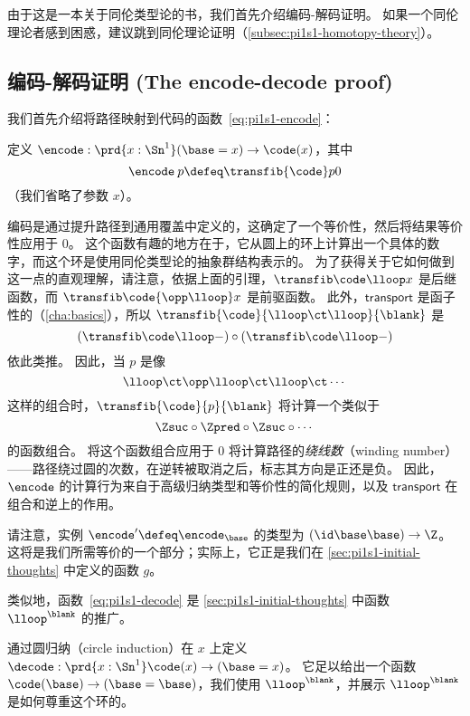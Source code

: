 由于这是一本关于同伦类型论的书，我们首先介绍编码-解码证明。
如果一个同伦理论者感到困惑，建议跳到同伦理论证明（\cref{subsec:pi1s1-homotopy-theory}）。

%
%
%

\subsection{编码-解码证明 (The encode-decode proof)}
\label{subsec:pi1s1-encode-decode}

%
%
%
我们首先介绍将路径映射到代码的函数~\eqref{eq:pi1s1-encode}：
\begin{defn}
  定义 $\encode : \prd{x : \Sn ^1} (\base=x) \rightarrow  \code(x)$，其中
  \[
    \encode \: p \defeq \transfib{\code} p 0
  \]
  （我们省略了参数 $x$）。
\end{defn}
编码是通过提升路径到通用覆盖中定义的，这确定了一个等价性，然后将结果等价性应用于 $0$。
这个函数有趣的地方在于，它从圆上的环上计算出一个具体的数字，而这个环是使用同伦类型论的抽象群结构表示的。
为了获得关于它如何做到这一点的直观理解，请注意，依据上面的引理，$\transfib \code \lloop x$ 是后继函数，而 $\transfib \code {\opp\lloop} x$ 是前驱函数。
此外，$\mathsf{transport}$ 是函子性的（\cref{cha:basics}），所以 $\transfib{\code} {\lloop \ct \lloop}{\blank}$ 是
\[(\transfib \code \lloop-) \circ (\transfib \code \lloop-)\]
依此类推。
因此，当 $p$ 是像
\[
  \lloop \ct \opp \lloop \ct \lloop \ct \cdots
\]
这样的组合时，$\transfib{\code}{p}{\blank}$ 将计算一个类似于
\[
  \Zsuc \circ \Zpred \circ \Zsuc \circ \cdots
\]
的函数组合。
将这个函数组合应用于 $0$ 将计算路径的\emph{绕线数}（winding number）——路径绕过圆的次数，在逆转被取消之后，标志其方向是正还是负。
因此，$\encode$ 的计算行为来自于高级归纳类型和等价性的简化规则，以及 $\mathsf{transport}$ 在组合和逆上的作用。

请注意，实例 $\encode' \defeq \encode_{\base}$ 的类型为 $(\id \base \base) \rightarrow \Z$。
这将是我们所需等价的一个部分；实际上，它正是我们在 \cref{sec:pi1s1-initial-thoughts} 中定义的函数 $g$。

类似地，函数~\eqref{eq:pi1s1-decode} 是 \cref{sec:pi1s1-initial-thoughts} 中函数 $\lloop^{\blank}$ 的推广。

\begin{defn}\label{thm:pi1s1-decode}
通过圆归纳（circle induction）在 $x$ 上定义 $\decode : \prd{x : \Sn ^1}\code(x) \rightarrow (\base=x)$。
它足以给出一个函数 ${\code(\base) \rightarrow (\base=\base)}$，我们使用 $\lloop^{\blank}$，并展示 $\lloop^{\blank}$ 是如何尊重这个环的。
\end{defn}

